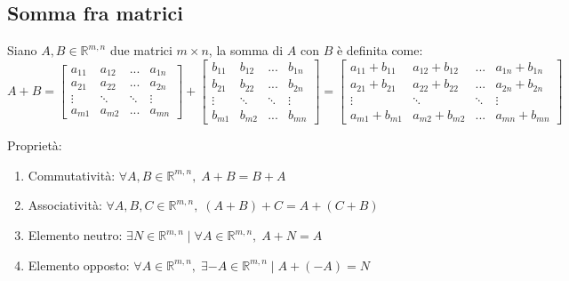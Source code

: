 \documentclass{article}
\begin{document}
\subsection{Somma fra matrici}
    Siano $A, B \in \mathbb{R}^{m, n}$ due matrici $m \times n$, la somma di $A$ con $B$ è definita come:
    \[
        A + B = 
        \begin{bmatrix}
            a_{11} & a_{12} & ... & a_{1n} \\
            a_{21} & a_{22} & ... & a_{2n} \\
            \vdots & \ddots & \ddots & \vdots \\
            a_{m1} & a_{m2} & ... & a_{mn} 
        \end{bmatrix}
        +
        \begin{bmatrix}
            b_{11} & b_{12} & ... & b_{1n} \\
            b_{21} & b_{22} & ... & b_{2n} \\
            \vdots & \ddots & \ddots & \vdots \\
            b_{m1} & b_{m2} & ... & b_{mn} 
        \end{bmatrix}
        =
        \begin{bmatrix}
            a_{11} + b_{11} & a_{12} + b_{12} & ... & a_{1n} + b_{1n} \\
            a_{21} + b_{21} & a_{22} + b_{22} & ... & a_{2n} + b_{2n} \\
            \vdots & \ddots & \ddots & \vdots \\
            a_{m1} + b_{m1} & a_{m2} + b_{m2} & ... & a_{mn} + b_{mn} 
        \end{bmatrix}
    \]

    \vspace{10pt}
    Proprietà:
    \begin{enumerate}[label=(\arabic*)]
        \item Commutatività: $\forall A, B \in \mathbb{R}^{m, n}, \; A + B = B + A$
        \item Associatività: $\forall A, B, C \in \mathbb{R}^{m, n}, \; (A + B) + C = A + (C + B)$
        \item Elemento neutro: $\exists N \in \mathbb{R}^{m, n} \; | \; \forall A \in \mathbb{R}^{m, n}, \; A + N = A $ 
        \item Elemento opposto: $\forall A \in \mathbb{R}^{m, n}, \; \exists -A \in \mathbb{R}^{m, n} \; | \; A + (-A) = N$
    \end{enumerate}
\end{document}
